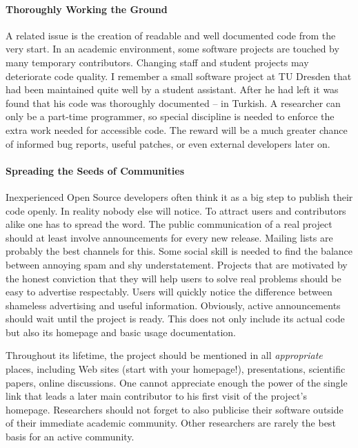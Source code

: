 \paragraph*{Thoroughly Working the Ground}
A related issue is the creation of readable and well documented code from the
very start. In an academic environment, some software projects are touched by
many temporary contributors. Changing staff and student projects may deteriorate
code quality. I remember a small software project at TU Dresden that had been
maintained quite well by a student assistant. After he had left it was found
that his code was thoroughly documented -- in Turkish. A researcher can only be
a part-time programmer, so special discipline is needed to enforce the extra
work needed for accessible code. The reward will be a much greater chance of
informed bug reports, useful patches, or even external developers later on.

\paragraph*{Spreading the Seeds of Communities}
Inexperienced Open Source developers often think it as a big step to publish
their code openly. In reality nobody else will notice. To attract users and
contributors alike one has to spread the word. The public communication of a
real project should at least involve announcements for every new release.
Mailing lists are probably the best channels for this. Some social skill is
needed to find the balance between annoying spam and shy understatement.
Projects that are motivated by the honest conviction that they will help users
to solve real problems should be easy to advertise respectably. Users will
quickly notice the difference between shameless advertising and useful
information. Obviously, active announcements should wait until the project is
ready. This does not only include its actual code but also its homepage and
basic usage documentation.

Throughout its lifetime, the project should be mentioned in all
\emph{appropriate} places, including Web sites (start with your homepage!),
presentations, scientific papers, online discussions. One cannot appreciate
enough the power of the single link that leads a later main contributor to his
first visit of the project's homepage. Researchers should not forget to also
publicise their software outside of their immediate academic community. Other
researchers are rarely the best basis for an active community.

